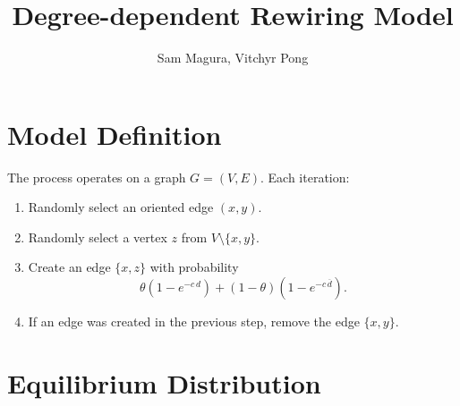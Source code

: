 \documentclass[a4paper,10pt]{article}
\title{Degree-dependent Rewiring Model}
\author{Sam Magura, Vitchyr Pong}
\begin{document}
\maketitle

\section{Model Definition}

The process operates on a graph $G = (V, E)$. Each iteration:

\begin{enumerate}
 \item Randomly select an oriented edge $(x, y)$.
 \item Randomly select a vertex $z$ from $V \setminus \{x, y\}$.
 \item Create an edge $\{x, z\}$ with probability
\begin{equation}
\theta (1 - e^{-c \, d}) + (1 - \theta) (1 - e^{-c  \, \overline{d}}).
\end{equation}
 \item If an edge was created in the previous step, remove the edge $\{x, y\}$.
\end{enumerate}

\section{Equilibrium Distribution}
\end{document}
